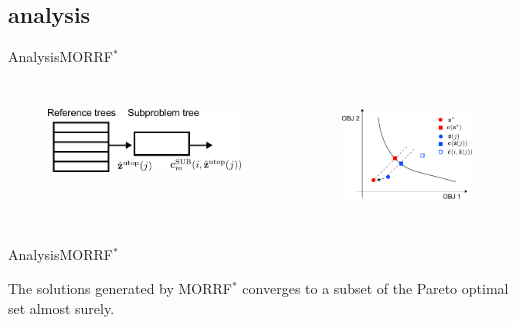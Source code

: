 \subsection{analysis}

\begin{frame}{Analysis}{MORRF$^{*}$}
\begin{columns}
	\begin{figure}
		\centering
		\includegraphics[width=\linewidth]{figure/cascade}
		\label{fig:morrt:cascade}
	\end{figure}
	\begin{figure}
		\centering
		\includegraphics[width=\linewidth]{figure/conv}
		\label{fig:morrt:conv}
	\end{figure}
\end{columns}
\end{frame}

\begin{frame}{Analysis}{MORRF$^{*}$}

\begin{thm}
The solutions generated by MORRF$^{*}$ converges to a subset of the Pareto optimal set
almost surely.
\end{thm}

\end{frame}